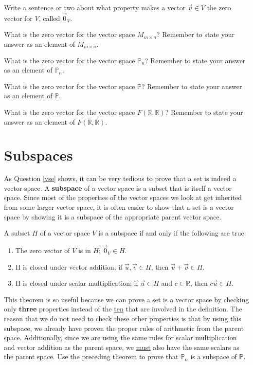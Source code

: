 \bq
\be
\item Write a sentence or two about what property makes a vector $\vec{v} \in V$ the zero vector for $V$, called $\vec{0}_V$.
\item What is the zero vector for the vector space $M_{m \times n}$? Remember to state your answer as an element of $M_{m \times n}$.
\item What is the zero vector for the vector space $\mathbb{P}_n$? Remember to state your answer as an element of $\mathbb{P}_n$.
\item What is the zero vector for the vector space $\mathbb{P}$? Remember to state your answer as an element of $\mathbb{P}$.
\item What is the zero vector for the vector space $F(\mathbb{R},\mathbb{R})$? Remember to state your answer as an element of $F(\mathbb{R},\mathbb{R})$.
\ee
\eq
\section{Subspaces}

As Question \ref{vse} shows, it can be very tedious to prove that a set is indeed a vector space. A \textbf{subspace} of a vector space is a subset that is itself a vector space. Since most of the properties of the vector spaces we look at get inherited from some larger vector space, it is often easier to show that a set is a vector space by showing it is a subspace of the appropriate parent vector space.

\begin{theorem}
A subset $H$ of a vector space $V$ is a subspace if and only if the following are true:
\begin{enumerate}
\item The zero vector of $V$ is in $H$; $\vec{0}_V \in H$.
\item H is closed under vector addition; if $\vec{u}, \vec{v} \in H$, then $\vec{u}+\vec{v}\in H$.
\item H is closed under scalar multiplication; if $\vec{u} \in H$ and $c \in \mathbb{R}$, then $c\vec{u} \in H$.
\end{enumerate}
\end{theorem}
This theorem is so useful because we can prove a set is a vector space by checking only \textbf{three} properties instead of the \underline{ten} that are involved in the definition. The reason that we do not need to check these other properties is that by using this subspace, we already have proven the proper rules of arithmetic from the parent space. Additionally, since we are using the same rules for scalar multiplication and vector addition as the parent space, we \underline{must} also have the same scalars as the parent space.
\bq Use the preceding theorem to prove that $\mathbb{P}_n$ is a subspace of $\mathbb{P}$.
\eq

